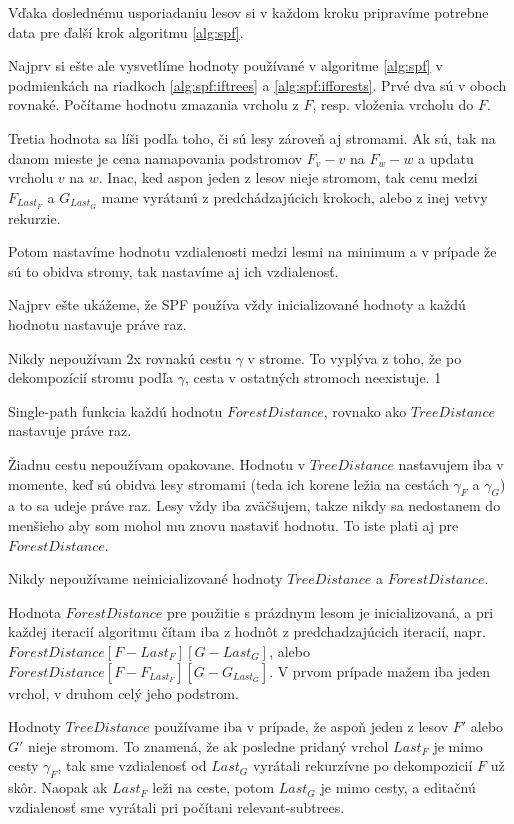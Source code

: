 Vďaka doslednému usporiadaniu lesov si v každom kroku pripravíme potrebne
data pre ďalší krok algoritmu \ref{alg:spf}.

Najprv si ešte ale vysvetlíme hodnoty používané v algoritme \ref{alg:spf} v podmienkách
na riadkoch \ref{alg:spf:iftrees} a \ref{alg:spf:ifforests}. Prvé dva sú v oboch rovnaké.
Počítame hodnotu zmazania vrcholu z $F$, resp. vloženia vrcholu do $F$.

Tretia hodnota sa líši podľa toho, či sú lesy zároveň aj stromami. Ak sú, tak na danom mieste
je cena namapovania podstromov $F_{v} - v$ na $F_{w} - w$ a updatu vrcholu $v$ na $w$.
Inac, ked aspon jeden z lesov nieje stromom, tak cenu medzi $F_{Last_{F}}$ a $G_{Last_{G}}$
mame vyrátanú z predchádzajúcich krokoch, alebo z inej vetvy rekurzie.

Potom nastavíme hodnotu vzdialenosti medzi lesmi na minimum a v prípade že sú to obidva stromy,
tak nastavíme aj ich vzdialenosť.

Najprv ešte ukážeme, že SPF používa vždy inicializované hodnoty a každú hodnotu nastavuje práve raz.

\begin{pozn}
  Nikdy nepoužívam 2x rovnakú cestu $\gamma$ v strome. To vyplýva z toho, že po dekompozícií
  stromu podľa $\gamma$, cesta v ostatných stromoch neexistuje.
1\end{pozn}

\begin{pozn}
  Single-path funkcia každú hodnotu $ForestDistance$, rovnako ako $TreeDistance$ nastavuje
  práve raz.
\end{pozn}

\begin{dukaz}
  Žiadnu cestu nepoužívam opakovane. Hodnotu v $TreeDistance$ nastavujem iba v momente,
  keď sú obidva lesy stromami (teda ich korene ležia na cestách $\gamma_{F}$ a $\gamma_{G}$)
  a to sa udeje práve raz.
  Lesy vždy iba zväčšujem, takze nikdy sa nedostanem do menšieho aby som mohol mu znovu nastaviť
  hodnotu. To iste plati aj pre $ForestDistance$.
\end{dukaz}

\begin{lemma}
  Nikdy nepoužívame neinicializované hodnoty $TreeDistance$ a $ForestDistance$.
\end{lemma}

\begin{dukaz}
  Hodnota $ForestDistance$ pre použitie s prázdnym lesom je inicializovaná, a pri každej iteracií
  algoritmu čítam iba z hodnôt z predchadzajúcich iteracií, napr.
  $ForestDistance[F - Last_{F}][G - Last_{G}]$, alebo $ForestDistance[F - F_{Last_{F}}][G - G_{Last_{G}}]$.
  V prvom prípade mažem iba jeden vrchol, v druhom celý jeho podstrom.

  Hodnoty $TreeDistance$ používame iba v prípade, že aspoň jeden z lesov $F'$ alebo $G'$ nieje stromom.
  To znamená, že ak posledne pridaný vrchol $Last_{F}$ je mimo cesty $\gamma_{F}$, tak sme vzdialenosť
  od $Last_{G}$ vyrátali rekurzívne po dekompozicií $F$ už skôr.
  Naopak ak $Last_{F}$ leži na ceste, potom $Last_{G}$ je mimo cesty, a editačnú vzdialenosť
  sme vyrátali pri počítani relevant-subtrees.
\end{dukaz}

